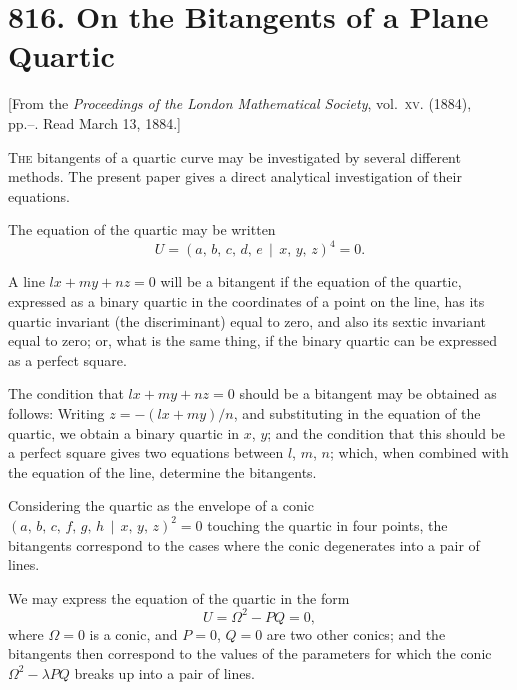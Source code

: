 \documentclass[11pt,a4paper]{article}
\theoremstyle{plain}
\theoremstyle{definition}
\theoremstyle{remark}
\begin{document}
\newpage
\section*{816. On the Bitangents of a Plane Quartic}

\begin{center}
\small[From the \textit{Proceedings of the London Mathematical Society}, vol.~\textsc{xv}. (1884),\\
pp.--. Read March 13, 1884.]
\end{center}

\bigskip

\noindent
\textsc{The} bitangents of a quartic curve may be investigated by several different methods. The present paper gives a direct analytical investigation of their equations.

The equation of the quartic may be written
\[
U = (a,\,b,\,c,\,d,\,e\,\mid\,x,\,y,\,z)^4 = 0.
\]

A line $lx + my + nz = 0$ will be a bitangent if the equation of the quartic, expressed as a binary quartic in the coordinates of a point on the line, has its quartic invariant (the discriminant) equal to zero, and also its sextic invariant equal to zero; or, what is the same thing, if the binary quartic can be expressed as a perfect square.

The condition that $lx + my + nz = 0$ should be a bitangent may be obtained as follows: Writing $z = -(lx + my)/n$, and substituting in the equation of the quartic, we obtain a binary quartic in $x$, $y$; and the condition that this should be a perfect square gives two equations between $l$, $m$, $n$; which, when combined with the equation of the line, determine the bitangents.

Considering the quartic as the envelope of a conic $(a,\,b,\,c,\,f,\,g,\,h\,\mid\,x,\,y,\,z)^2 = 0$ touching the quartic in four points, the bitangents correspond to the cases where the conic degenerates into a pair of lines.

We may express the equation of the quartic in the form
\[
U = \Omega^2 - PQ = 0,
\]
where $\Omega = 0$ is a conic, and $P = 0$, $Q = 0$ are two other conics; and the bitangents then correspond to the values of the parameters for which the conic $\Omega^2 - \lambda PQ$ breaks up into a pair of lines.
\end{document}
